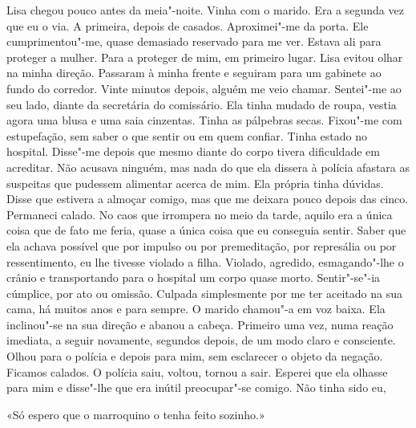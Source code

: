 Lisa chegou pouco antes da meia"-noite. Vinha com o marido. Era a
segunda vez que eu o via. A primeira, depois de casados. Aproximei"-me
da porta. Ele cumprimentou"-me, quase demasiado reservado para me ver.
Estava ali para proteger a mulher. Para a proteger de mim, em primeiro
lugar. Lisa evitou olhar na minha direção. Passaram à minha frente e
seguiram para um gabinete ao fundo do corredor. Vinte minutos depois,
alguém me veio chamar. Sentei"-me ao seu lado, diante da secretária do
comissário. Ela tinha mudado de roupa, vestia agora uma blusa e uma saia
cinzentas. Tinha as pálpebras secas. Fixou"-me com estupefação, sem
saber o que sentir ou em quem confiar. Tinha estado no hospital.
Disse"-me depois que mesmo diante do corpo tivera dificuldade em
acreditar. Não acusava ninguém, mas nada do que ela dissera à polícia
afastara as suspeitas que pudessem alimentar acerca de mim. Ela própria
tinha dúvidas. Disse que estivera a almoçar comigo, mas que me deixara
pouco depois das cinco. Permaneci calado. No caos que irrompera no meio
da tarde, aquilo era a única coisa que de fato me feria, quase a única
coisa que eu conseguia sentir. Saber que ela achava possível que por
impulso ou por premeditação, por represália ou por ressentimento, eu lhe
tivesse violado a filha. Violado, agredido, esmagando"-lhe o crânio e
transportando para o hospital um corpo quase morto. Sentir"-se"-ia
cúmplice, por ato ou omissão. Culpada simplesmente por me ter aceitado
na sua cama, há muitos anos e para sempre. O marido chamou"-a em voz
baixa. Ela inclinou"-se na sua direção e abanou a cabeça. Primeiro uma
vez, numa reação imediata, a seguir novamente, segundos depois, de um
modo claro e consciente. Olhou para o polícia e depois para mim, sem
esclarecer o objeto da negação. Ficamos calados. O polícia saiu,
voltou, tornou a sair. Esperei que ela olhasse para mim e disse"-lhe que
era inútil preocupar"-se comigo. Não tinha sido eu,

«Só espero que o marroquino o tenha feito sozinho.»

